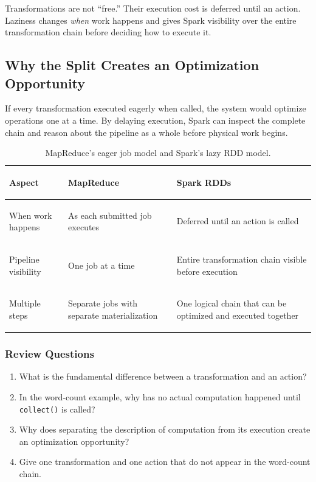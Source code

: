\documentclass[11pt,a4paper,oneside]{book}
\begin{document}
\begin{keyconcept}
Transformations are not ``free.'' Their execution cost is deferred until an action. Laziness changes \emph{when} work happens and gives Spark visibility over the entire transformation chain before deciding how to execute it.
\end{keyconcept}

\subsection{Why the Split Creates an Optimization Opportunity}

If every transformation executed eagerly when called, the system would optimize operations one at a time. By delaying execution, Spark can inspect the complete chain and reason about the pipeline as a whole before physical work begins.

\begin{table}[htbp]
\centering
\caption{MapReduce's eager job model and Spark's lazy RDD model.}
\label{tab:eager-vs-lazy}
\begin{tabularx}{\textwidth}{>{\bfseries\raggedright\arraybackslash}p{3.5cm} Y Y}
\toprule
{}
Aspect & MapReduce & Spark RDDs \\
\midrule
When work happens & As each submitted job executes & Deferred until an action is called \\
Pipeline visibility & One job at a time & Entire transformation chain visible before execution \\
Multiple steps & Separate jobs with separate materialization & One logical chain that can be optimized and executed together \\
\bottomrule
\end{tabularx}
\end{table}

\subsubsection*{Review Questions}
\begin{enumerate}
    \item What is the fundamental difference between a transformation and an action?
    \item In the word-count example, why has no actual computation happened until \texttt{collect()} is called?
    \item Why does separating the description of computation from its execution create an optimization opportunity?
    \item Give one transformation and one action that do not appear in the word-count chain.
\end{enumerate}
\end{document}
